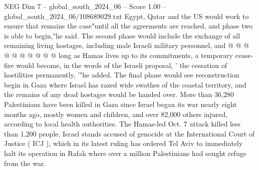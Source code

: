 \begin{textsample}{NEG Dim 7 – global\_south\_2024\_06 – Score 1.00 – global\_south\_2024\_06/108689029.txt}
Egypt, Qatar and the US would work to ensure that remains the case"until all the agreements are reached, and phase two is able to begin,"he said.
The second phase would include the exchange of all remaining living hostages, including male Israeli military personnel, and @ @ @ @ @ @ @ @ @ @ long as Hamas lives up to its commitments, a temporary cease-fire would become, in the words of the Israeli proposal, ' the cessation of hostilities permanently, '"he added.
The final phase would see reconstruction begin in Gaza where Israel has razed wide swathes of the coastal territory, and the remains of any dead hostages would be handed over.
More than 36,280 Palestinians have been killed in Gaza since Israel began its war nearly eight months ago, mostly women and children, and over 82,000 others injured, according to local health authorities.
The Hamas-led Oct. 7 attack killed less than 1,200 people.
Israel stands accused of genocide at the International Court of Justice ( ICJ ), which in its latest ruling has ordered Tel Aviv to immediately halt its operation in Rafah where over a million Palestinians had sought refuge from the war.

\end{textsample}
